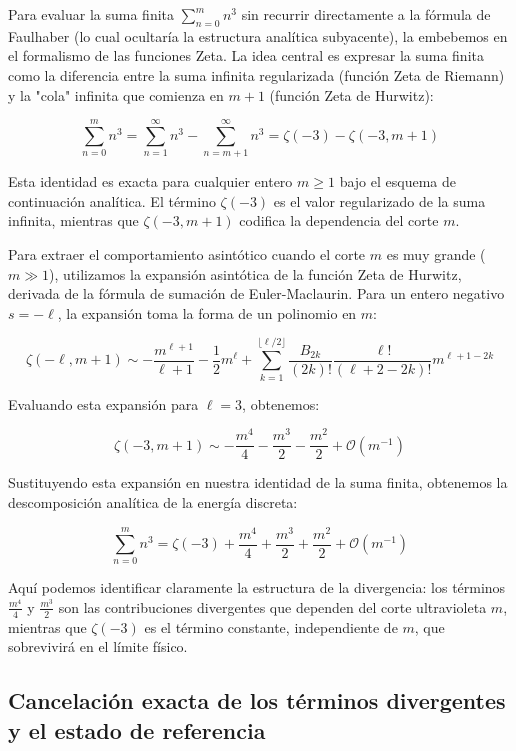 Para evaluar la suma finita $\sum_{n=0}^{m} n^3$ sin recurrir directamente a la fórmula de Faulhaber (lo cual ocultaría la estructura analítica subyacente), la embebemos en el formalismo de las funciones Zeta. La idea central es expresar la suma finita como la diferencia entre la suma infinita regularizada (función Zeta de Riemann) y la "cola" infinita que comienza en $m+1$ (función Zeta de Hurwitz):

$$ \sum_{n=0}^{m} n^3 = \sum_{n=1}^{\infty} n^3 - \sum_{n=m+1}^{\infty} n^3 = \zeta(-3) - \zeta(-3, m+1) $$

Esta identidad es exacta para cualquier entero $m \ge 1$ bajo el esquema de continuación analítica. El término $\zeta(-3)$ es el valor regularizado de la suma infinita, mientras que $\zeta(-3, m+1)$ codifica la dependencia del corte $m$.

Para extraer el comportamiento asintótico cuando el corte $m$ es muy grande ($m \gg 1$), utilizamos la expansión asintótica de la función Zeta de Hurwitz, derivada de la fórmula de sumación de Euler-Maclaurin. Para un entero negativo $s = -\ell$, la expansión toma la forma de un polinomio en $m$:

$$ \zeta(-\ell, m+1) \sim - \frac{m^{\ell+1}}{\ell+1} - \frac{1}{2}m^\ell + \sum_{k=1}^{\lfloor \ell/2 \rfloor} \frac{B_{2k}}{(2k)!} \frac{\ell!}{(\ell+2-2k)!} m^{\ell+1-2k} $$

Evaluando esta expansión para $\ell = 3$, obtenemos:

$$ \zeta(-3, m+1) \sim - \frac{m^4}{4} - \frac{m^3}{2} - \frac{m^2}{2} + \mathcal{O}(m^{-1}) $$

Sustituyendo esta expansión en nuestra identidad de la suma finita, obtenemos la descomposición analítica de la energía discreta:

$$ \sum_{n=0}^{m} n^3 = \zeta(-3) + \frac{m^4}{4} + \frac{m^3}{2} + \frac{m^2}{2} + \mathcal{O}(m^{-1}) $$

Aquí podemos identificar claramente la estructura de la divergencia: los términos $\frac{m^4}{4}$ y $\frac{m^3}{2}$ son las contribuciones divergentes que dependen del corte ultravioleta $m$, mientras que $\zeta(-3)$ es el término constante, independiente de $m$, que sobrevivirá en el límite físico.

\subsection{Cancelación exacta de los términos divergentes y el estado de referencia}

